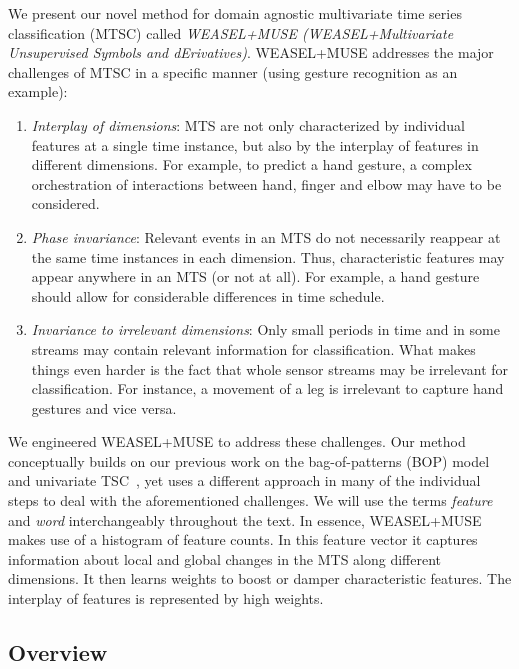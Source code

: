 \documentclass[sigconf]{acmart}
\begin{document}
We present our novel method for domain agnostic multivariate time series classification (MTSC) called \emph{WEASEL+MUSE (WEASEL+Multivariate Unsupervised Symbols and dErivatives)}. WEASEL+MUSE addresses the major challenges of MTSC in a specific manner (using gesture recognition as an example):


\begin{enumerate}
	\item \emph{Interplay of dimensions}: MTS are not only characterized by individual features at a single time instance, but also by the interplay of features in different dimensions. For example, to predict a hand gesture, a complex orchestration of interactions between hand, finger and elbow may have to be considered. 
	
	\item \emph{Phase invariance}: Relevant events in an MTS do not necessarily reappear at the same time instances in each dimension. Thus, characteristic features may appear anywhere in an MTS (or not at all). For example, a hand gesture should allow for considerable differences in time schedule.
		
	\item \emph{Invariance to irrelevant dimensions}: Only small periods in time and in some streams may contain relevant information for classification. What makes things even harder is the fact that whole sensor streams may be irrelevant for classification. For instance, a movement of a leg is irrelevant to capture hand gestures and vice versa. 
\end{enumerate}

We engineered WEASEL+MUSE to address these challenges. Our method conceptually builds on our previous work on the bag-of-patterns (BOP) model and univariate TSC~\cite{schafer2014boss,schaefer2017weasel}, yet uses a different approach in many of the individual steps to deal with the aforementioned challenges. We will use the terms \emph{feature} and \emph{word} interchangeably throughout the text. 
In essence, WEASEL+MUSE makes use of a histogram of feature counts. In this feature vector it captures information about local and global changes in the MTS along different dimensions. It then learns weights to boost or damper characteristic features. The interplay of features is represented by high weights.


\subsection{Overview}
\end{document}
